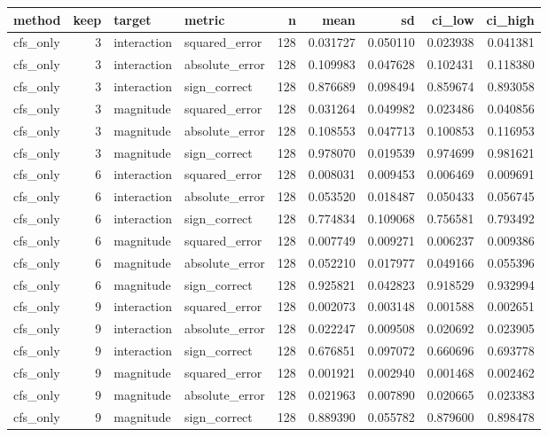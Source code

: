 \begin{tabular}{lrllrrrrr}
\toprule
method & keep & target & metric & n & mean & sd & ci_low & ci_high \\
\midrule
cfs_only & 3 & interaction & squared_error & 128 & 0.031727 & 0.050110 & 0.023938 & 0.041381 \\
cfs_only & 3 & interaction & absolute_error & 128 & 0.109983 & 0.047628 & 0.102431 & 0.118380 \\
cfs_only & 3 & interaction & sign_correct & 128 & 0.876689 & 0.098494 & 0.859674 & 0.893058 \\
cfs_only & 3 & magnitude & squared_error & 128 & 0.031264 & 0.049982 & 0.023486 & 0.040856 \\
cfs_only & 3 & magnitude & absolute_error & 128 & 0.108553 & 0.047713 & 0.100853 & 0.116953 \\
cfs_only & 3 & magnitude & sign_correct & 128 & 0.978070 & 0.019539 & 0.974699 & 0.981621 \\
cfs_only & 6 & interaction & squared_error & 128 & 0.008031 & 0.009453 & 0.006469 & 0.009691 \\
cfs_only & 6 & interaction & absolute_error & 128 & 0.053520 & 0.018487 & 0.050433 & 0.056745 \\
cfs_only & 6 & interaction & sign_correct & 128 & 0.774834 & 0.109068 & 0.756581 & 0.793492 \\
cfs_only & 6 & magnitude & squared_error & 128 & 0.007749 & 0.009271 & 0.006237 & 0.009386 \\
cfs_only & 6 & magnitude & absolute_error & 128 & 0.052210 & 0.017977 & 0.049166 & 0.055396 \\
cfs_only & 6 & magnitude & sign_correct & 128 & 0.925821 & 0.042823 & 0.918529 & 0.932994 \\
cfs_only & 9 & interaction & squared_error & 128 & 0.002073 & 0.003148 & 0.001588 & 0.002651 \\
cfs_only & 9 & interaction & absolute_error & 128 & 0.022247 & 0.009508 & 0.020692 & 0.023905 \\
cfs_only & 9 & interaction & sign_correct & 128 & 0.676851 & 0.097072 & 0.660696 & 0.693778 \\
cfs_only & 9 & magnitude & squared_error & 128 & 0.001921 & 0.002940 & 0.001468 & 0.002462 \\
cfs_only & 9 & magnitude & absolute_error & 128 & 0.021963 & 0.007890 & 0.020665 & 0.023383 \\
cfs_only & 9 & magnitude & sign_correct & 128 & 0.889390 & 0.055782 & 0.879600 & 0.898478 \\

\end{tabular}
